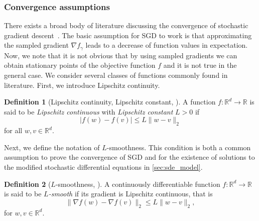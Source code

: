 \documentclass[12pt]{article}
\theoremstyle{definition}
\newtheorem{definition}[definition]{Definition}
\numberwithin{equation}{section}
\newcommand{\R}{\mathbb{R}}
\newcommand{\norm}[1]{\lVert{#1}\rVert_2}
\begin{document}
\subsubsection{Convergence assumptions}
There exists a broad body of literature discussing the convergence of stochastic gradient descent~\cite{allen-zhuConvergenceTheoryDeep2019,mertikopoulosAlmostSureConvergence2020,vaswaniFastFasterConvergence2019,gowerSGDGeneralAnalysis2019,liConvergenceStochasticGradient2019,sebbouhAlmostSureConvergence2021,bottouOptimizationMethodsLargeScale2018}.
The basic assumption for SGD to work is that approximating the sampled gradient $\nabla f_{\gamma}$ leads to a decrease of function values in expectation. Now, we note that it is not obvious that by using sampled gradients we can obtain stationary points of the objective function $f$ and it is not true in the general case. We consider several classes of functions commonly found in literature.
First, we introduce Lipschitz continuity. 
\begin{definition}[Lipschitz continuity, Lipschitz constant, ]
  \label{def:lipschitz_continuity}
  A function $f : \R^d \rightarrow \R$ is said to be \emph{Lipschitz continuous} with \emph{Lipschitz constant} $L >0$ if
  \begin{equation*}
    |f(w) - f(v)| \leq L \norm{w - v}
  \end{equation*}
  for all $w,v \in \R^d$.
\end{definition}
Next, we define the notation of $L$-smoothness. This condition is both a common assumption to prove the convergence of SGD and for the existence of solutions to the modified stochastic differential equations in \autoref{sec:sde_model}.
\begin{definition}[$L$-smoothness, ]
  \label{def:l_smooth}
  A continuously differentiable function $f : \R^d \rightarrow \R$ is said to be \emph{$L$-smooth} if its gradient is Lipschitz continuous, that is 
  \begin{equation*}
    \norm{\nabla f(w) - \nabla f(v) } \leq L \norm{w-v},
  \end{equation*}
  for $w,v \in \R^d$.
\end{definition}
\end{document}
